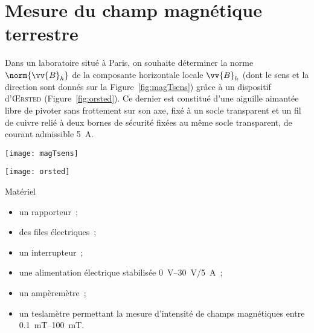 \documentclass[a4paper, 10pt, final, garamond]{book}
\begin{document}
\section{Mesure du champ magnétique terrestre}
\label{sec:meschpterre}
Dans un laboratoire situé à Paris, on souhaite déterminer la norme
$\norm{\vv{B}_h}$ de la composante horizontale locale $\vv{B}_h$ (dont le sens
et la direction sont donnés sur la Figure~\ref{fig:magTsens}) grâce à un
dispositif d'\textsc{Œrsted} (Figure~\ref{fig:orsted}). Ce dernier est constitué
d'une aiguille aimantée libre de pivoter sans frottement sur son axe, fixé à un
socle transparent et un fil de cuivre relié à deux bornes de sécurité fixées au
même socle transparent, de courant admissible \SI{5}{A}.
\noindent
\begin{minipage}[t]{.5\linewidth}
  \begin{center}
    \texttt{[image: magTsens]}
    \label{fig:magTsens}
  \end{center}
\end{minipage}
\hfill
\begin{minipage}[t]{.5\linewidth}
  \begin{center}
    \texttt{[image: orsted]}
    \label{fig:orsted}
  \end{center}
\end{minipage}
\begin{rexem}{Matériel}
  \noindent
  \begin{minipage}[t]{.5\linewidth}
    \begin{itemize}[label=$\diamond$, leftmargin=10pt]
      \item un rapporteur~;
      \item des files électriques~;
      \item un interrupteur~;
    \end{itemize}
  \end{minipage}
  \hfill
  \begin{minipage}[t]{.5\linewidth}
    \begin{itemize}[label=$\diamond$, leftmargin=10pt]
      \item une alimentation électrique stabilisée \SIrange{0}{30}{V}/\SI{5}{A}~;
      \item un ampèremètre~;
      \item un teslamètre permettant la mesure d'intensité de champs
        magnétiques entre \SIrange{0.1}{100}{mT}.
    \end{itemize}
  \end{minipage}
\end{rexem}
\end{document}
